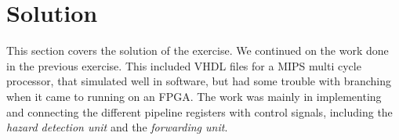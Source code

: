 \section{Solution}\label{chapter:Solution}
This section covers the solution of the exercise. We continued on the work done in the
previous exercise. This included VHDL files for a MIPS multi cycle processor, that 
simulated well in software, but had some trouble with branching when it came to 
running on an FPGA. The work was mainly in implementing and connecting the different 
pipeline registers with control signals, including the \textit{hazard detection unit}
and the \textit{forwarding unit}.



